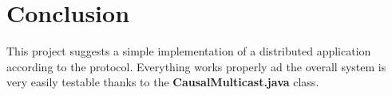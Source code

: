 \documentclass[conference]{IEEEtran}
\begin{document}
\section{Conclusion}
This project suggests a simple implementation of a distributed application
according to the protocol. Everything works properly ad the overall system
is very easily testable thanks to the \textbf{CausalMulticast.java} class. 

\end{document}
